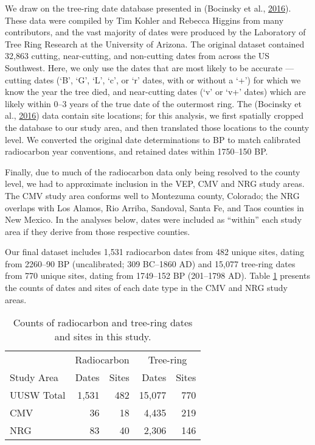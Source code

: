 \documentclass[
]{sa}
\begin{document}
We draw on the tree-ring date database presented in (Bocinsky et al., \protect\hyperlink{ref-Bocinsky2016}{2016}). These data were compiled by Tim Kohler and Rebecca Higgins from many contributors, and the vast majority of dates were produced by the Laboratory of Tree Ring Research at the University of Arizona. The original dataset contained 32,863 cutting, near-cutting, and non-cutting dates from across the US Southwest. Here, we only use the dates that are most likely to be accurate --- cutting dates (`B', `G', `L', `c', or `r' dates, with or without a `+') for which we know the year the tree died, and near-cutting dates (`v' or `v+' dates) which are likely within 0--3 years of the true date of the outermost ring. The (Bocinsky et al., \protect\hyperlink{ref-Bocinsky2016}{2016}) data contain site locations; for this analysis, we first spatially cropped the database to our study area, and then translated those locations to the county level. We converted the original date determinations to BP to match calibrated radiocarbon year conventions, and retained dates within 1750--150 BP.

Finally, due to much of the radiocarbon data only being resolved to the county level, we had to approximate inclusion in the VEP, CMV and NRG study areas. The CMV study area conforms well to Montezuma county, Colorado; the NRG overlaps with Los Alamos, Rio Arriba, Sandoval, Santa Fe, and Taos counties in New Mexico. In the analyses below, dates were included as ``within'' each study area if they derive from those respective counties.

Our final dataset includes 1,531 radiocarbon dates from 482 unique sites, dating from 2260--90 BP (uncalibrated; 309 BC--1860 AD) and 15,077 tree-ring dates from 770 unique sites, dating from 1749--152 BP (201--1798 AD). Table \ref{tab:Table1} presents the counts of dates and sites of each date type in the CMV and NRG study areas.

\begin{table}

\caption{\label{tab:Table1}Counts of radiocarbon and tree-ring dates and sites in this study.}
\centering
\begin{tabular}[t]{lrrrr}
\toprule
\multicolumn{1}{c}{ } & \multicolumn{2}{c}{Radiocarbon} & \multicolumn{2}{c}{Tree-ring} \\
\cmidrule(l{3pt}r{3pt}){2-3} \cmidrule(l{3pt}r{3pt}){4-5}
Study Area & Dates & Sites & Dates & Sites\\
\midrule
UUSW Total & 1,531 & 482 & 15,077 & 770\\
CMV & 36 & 18 & 4,435 & 219\\
NRG & 83 & 40 & 2,306 & 146\\
\bottomrule
\end{tabular}
\end{table}
\end{document}
